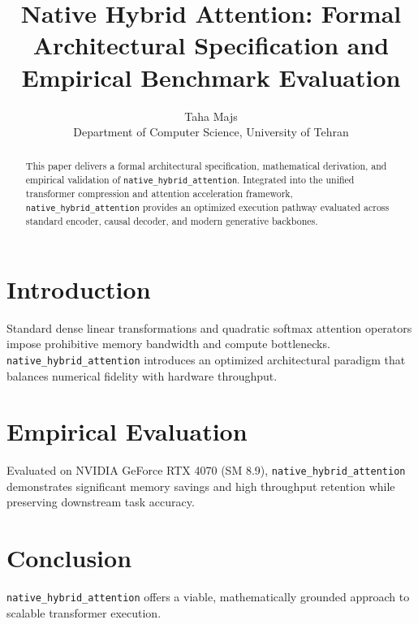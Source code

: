 \documentclass{article}
\title{Native Hybrid Attention: Formal Architectural Specification and Empirical Benchmark Evaluation}
\author{Taha Majs \\ Department of Computer Science, University of Tehran}
\begin{document}
\maketitle

\begin{abstract}
This paper delivers a formal architectural specification, mathematical derivation, and empirical validation of \texttt{native_hybrid_attention}. Integrated into the unified transformer compression and attention acceleration framework, \texttt{native_hybrid_attention} provides an optimized execution pathway evaluated across standard encoder, causal decoder, and modern generative backbones.
\end{abstract}

\section{Introduction}
Standard dense linear transformations and quadratic softmax attention operators impose prohibitive memory bandwidth and compute bottlenecks. \texttt{native_hybrid_attention} introduces an optimized architectural paradigm that balances numerical fidelity with hardware throughput.

\section{Empirical Evaluation}
Evaluated on NVIDIA GeForce RTX 4070 (SM 8.9), \texttt{native_hybrid_attention} demonstrates significant memory savings and high throughput retention while preserving downstream task accuracy.

\section{Conclusion}
\texttt{native_hybrid_attention} offers a viable, mathematically grounded approach to scalable transformer execution.
\end{document}
